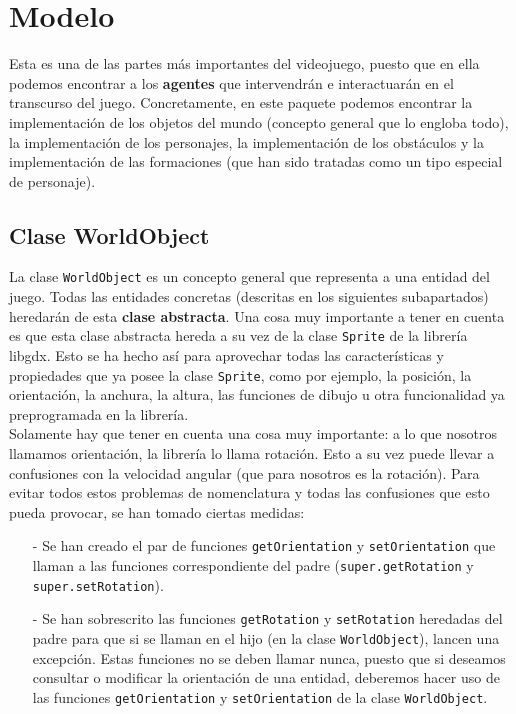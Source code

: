 \medskip
\section{Modelo}

Esta es una de las partes más importantes del videojuego, puesto que en ella podemos encontrar a los \textbf{agentes} que intervendrán e interactuarán en el transcurso del juego. Concretamente, en este paquete podemos encontrar la implementación de los objetos del mundo (concepto general que lo engloba todo), la implementación de los personajes, la implementación de los obstáculos y la implementación de las formaciones (que han sido tratadas como un tipo especial de personaje).

\subsection{Clase WorldObject}

La clase \texttt{WorldObject} es un concepto general que representa a una entidad del juego. Todas las entidades concretas (descritas en los siguientes subapartados) heredarán de esta \textbf{clase abstracta}. Una cosa muy importante a tener en cuenta es que esta clase abstracta hereda a su vez de la clase \texttt{Sprite} de la librería libgdx. Esto se ha hecho así para aprovechar todas las características y propiedades que ya posee la clase \texttt{Sprite}, como por ejemplo, la posición, la orientación, la anchura, la altura, las funciones de dibujo u otra funcionalidad ya preprogramada en la librería. \\

Solamente hay que tener en cuenta una cosa muy importante: a lo que nosotros llamamos orientación, la librería lo llama rotación. Esto a su vez puede llevar a confusiones con la velocidad angular (que para nosotros es la rotación). Para evitar todos estos problemas de nomenclatura y todas las confusiones que esto pueda provocar, se han tomado ciertas medidas:

\begin{itemize}
	\item[-] Se han creado el par de funciones \texttt{getOrientation} y \texttt{setOrientation} que llaman a las funciones correspondiente del padre (\texttt{super.getRotation} y \texttt{super.setRotation}).
	\item[-] Se han sobrescrito las funciones \texttt{getRotation} y \texttt{setRotation} heredadas del padre para que si se llaman en el hijo (en la clase \texttt{WorldObject}), lancen una excepción. Estas funciones no se deben llamar nunca, puesto que si deseamos consultar o modificar la orientación de una entidad, deberemos hacer uso de las funciones \texttt{getOrientation} y \texttt{setOrientation} de la clase \texttt{WorldObject}.
\end{itemize}

